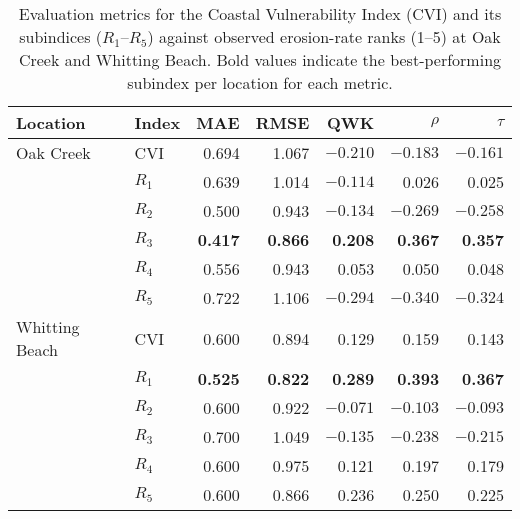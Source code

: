 \begin{table}[htbp]
\centering
\caption{Evaluation metrics for the Coastal Vulnerability Index (CVI) and its
subindices ($R_1$--$R_5$) against observed erosion-rate ranks (1--5) at Oak
Creek and Whitting Beach. Bold values indicate the best-performing subindex per
location for each metric.}
\label{tab:cvi_eval_oak_whitting}
\begin{tabular}{l l r r r r r}
\toprule
Location & Index & MAE & RMSE & QWK & $\rho$ & $\tau$ \\
\midrule
Oak Creek & CVI   & 0.694 & 1.067 & $-0.210$ & $-0.183$ & $-0.161$ \\
          & $R_1$ & 0.639 & 1.014 & $-0.114$ &  0.026 &  0.025 \\
          & $R_2$ & 0.500 & 0.943 & $-0.134$ & $-0.269$ & $-0.258$ \\
          & $R_3$ & \textbf{0.417} & \textbf{0.866} & \textbf{0.208} & \textbf{0.367} & \textbf{0.357} \\
          & $R_4$ & 0.556 & 0.943 &  0.053 &  0.050 &  0.048 \\
          & $R_5$ & 0.722 & 1.106 & $-0.294$ & $-0.340$ & $-0.324$ \\
\midrule
Whitting Beach & CVI   & 0.600 & 0.894 & 0.129 & 0.159 & 0.143 \\
               & $R_1$ & \textbf{0.525} & \textbf{0.822} & \textbf{0.289} & \textbf{0.393} & \textbf{0.367} \\
               & $R_2$ & 0.600 & 0.922 & $-0.071$ & $-0.103$ & $-0.093$ \\
               & $R_3$ & 0.700 & 1.049 & $-0.135$ & $-0.238$ & $-0.215$ \\
               & $R_4$ & 0.600 & 0.975 &  0.121 &  0.197 &  0.179 \\
               & $R_5$ & 0.600 & 0.866 &  0.236 &  0.250 &  0.225 \\
\bottomrule
\end{tabular}
\end{table}
